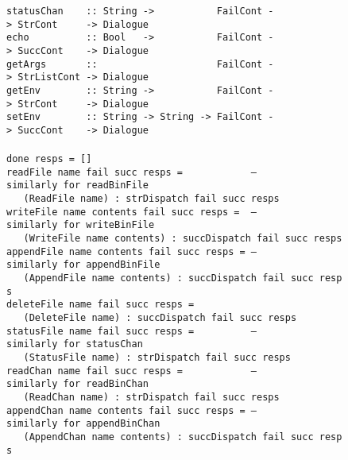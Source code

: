 \begin{figure}
{\mbox{\tt statusChan\ \ \ \ ::\ String\ ->\ \ \ \ \ \ \ \ \ \ \ FailCont\ ->\ StrCont\ \ \ \ \ ->\ Dialogue}\\
\mbox{\tt echo\ \ \ \ \ \ \ \ \ \ ::\ Bool\ \ \ ->\ \ \ \ \ \ \ \ \ \ \ FailCont\ ->\ SuccCont\ \ \ \ ->\ Dialogue}\\
\mbox{\tt getArgs\ \ \ \ \ \ \ ::\ \ \ \ \ \ \ \ \ \ \ \ \ \ \ \ \ \ \ \ \ FailCont\ ->\ StrListCont\ ->\ Dialogue}\\
\mbox{\tt getEnv\ \ \ \ \ \ \ \ ::\ String\ ->\ \ \ \ \ \ \ \ \ \ \ FailCont\ ->\ StrCont\ \ \ \ \ ->\ Dialogue}\\
\mbox{\tt setEnv\ \ \ \ \ \ \ \ ::\ String\ ->\ String\ ->\ FailCont\ ->\ SuccCont\ \ \ \ ->\ Dialogue}\\
\mbox{\tt }\\[-8pt]
\mbox{\tt done\ resps\ =\ []}\\
\mbox{\tt readFile\ name\ fail\ succ\ resps\ =\ \ \ \ \ \ \ \ \ \ \ \ --similarly\ for\ readBinFile}\\
\mbox{\tt \ \ \ (ReadFile\ name)\ :\ strDispatch\ fail\ succ\ resps}\\
\mbox{\tt writeFile\ name\ contents\ fail\ succ\ resps\ =\ \ --similarly\ for\ writeBinFile}\\
\mbox{\tt \ \ \ (WriteFile\ name\ contents)\ :\ succDispatch\ fail\ succ\ resps}\\
\mbox{\tt appendFile\ name\ contents\ fail\ succ\ resps\ =\ --similarly\ for\ appendBinFile}\\
\mbox{\tt \ \ \ (AppendFile\ name\ contents)\ :\ succDispatch\ fail\ succ\ resps}\\
\mbox{\tt deleteFile\ name\ fail\ succ\ resps\ =}\\
\mbox{\tt \ \ \ (DeleteFile\ name)\ :\ succDispatch\ fail\ succ\ resps}\\
\mbox{\tt statusFile\ name\ fail\ succ\ resps\ =\ \ \ \ \ \ \ \ \ \ --similarly\ for\ statusChan}\\
\mbox{\tt \ \ \ (StatusFile\ name)\ :\ strDispatch\ fail\ succ\ resps}\\
\mbox{\tt readChan\ name\ fail\ succ\ resps\ =\ \ \ \ \ \ \ \ \ \ \ \ --similarly\ for\ readBinChan}\\
\mbox{\tt \ \ \ (ReadChan\ name)\ :\ strDispatch\ fail\ succ\ resps}\\
\mbox{\tt appendChan\ name\ contents\ fail\ succ\ resps\ =\ --similarly\ for\ appendBinChan}\\
\mbox{\tt \ \ \ (AppendChan\ name\ contents)\ :\ succDispatch\ fail\ succ\ resps}\\
}
\end{figure}
